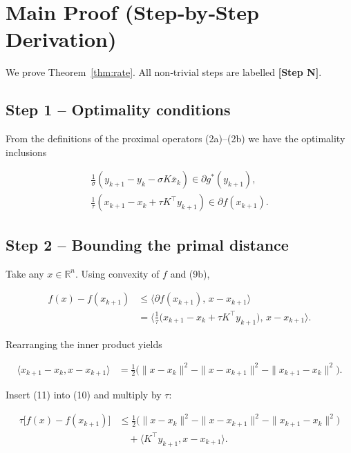 \documentclass{article}
\begin{document}
\section*{Main Proof (Step‑by‑Step Derivation)}
We prove Theorem~\ref{thm:rate}.  
All non‑trivial steps are labelled \textbf{[Step N]}.

\subsection*{Step 1 – Optimality conditions}
From the definitions of the proximal operators (2a)–(2b) we have the optimality inclusions  

\[
\begin{aligned}
\frac{1}{\sigma}(y_{k+1}-y_{k}-\sigma K\bar x_{k})\in \partial g^{*}(y_{k+1}), \tag{9a}\\
\frac{1}{\tau}(x_{k+1}-x_{k}+\tau K^{\!\top}y_{k+1})\in \partial f(x_{k+1}). \tag{9b}
\end{aligned}
\]

\subsection*{Step 2 – Bounding the primal distance}
Take any $x\in\mathbb{R}^{n}$. Using convexity of $f$ and (9b),

\[
\begin{aligned}
f(x)-f(x_{k+1})
&\le \langle \partial f(x_{k+1}),\,x-x_{k+1}\rangle \\
&= \Big\langle \frac{1}{\tau}\bigl(x_{k+1}-x_{k}+\tau K^{\!\top}y_{k+1}\bigr),\,x-x_{k+1}\Big\rangle. \tag{10}
\end{aligned}
\]

Rearranging the inner product yields  

\[
\begin{aligned}
\langle x_{k+1}-x_{k},x-x_{k+1}\rangle
&=\tfrac12\bigl(\|x-x_{k}\|^{2}-\|x-x_{k+1}\|^{2}-\|x_{k+1}-x_{k}\|^{2}\bigr). \tag{11}
\end{aligned}
\]

Insert (11) into (10) and multiply by $\tau$:

\[
\begin{aligned}
\tau\bigl[f(x)-f(x_{k+1})\bigr]
&\le \tfrac12\bigl(\|x-x_{k}\|^{2}-\|x-x_{k+1}\|^{2}-\|x_{k+1}-x_{k}\|^{2}\bigr) \\
&\quad +\langle K^{\!\top}y_{k+1},x-x_{k+1}\rangle. \tag{12}
\end{aligned}
\]
\end{document}
